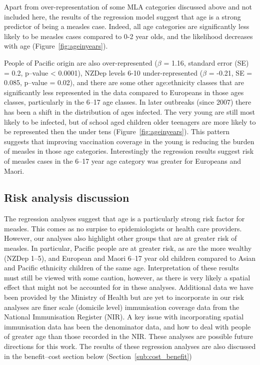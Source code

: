 \documentclass{article}
\begin{document}
Apart from over-representation of some MLA categories discussed above and not included here, the results of the regression model suggest that age is a strong predictor of being a measles case. Indeed, all age categories are significantly less likely to be measles cases compared to 0-2 year olds, and the likelihood decreases with age (Figure~\ref{fig:ageinyears}).

People of Pacific origin are also over-represented ($\beta$ = 1.16, standard error (SE) = 0.2, p--value < 0.0001), NZDep levels 6-10 under-represented ($\beta$ = -0.21, SE = 0.085, p--value = 0.02), and there are some other age:ethnicity classes that are significantly less represented in the data compared to Europeans in those ages classes, particularly in the 6--17 age classes. In later outbreaks (since 2007) there has been a shift in the distribution of ages infected. The very young are still most likely to be infected, but of school aged children older teenagers are more likely to be represented then the under tens (Figure~\ref{fig:ageinyears}). This pattern suggests that improving vaccination coverage in the young is reducing the burden of measles in those age categories. Interestingly the regression results suggest risk of measles cases in the 6--17 year age category was greater for Europeans and Maori.

\subsection{Risk analysis discussion}

The regression analyses suggest that age is a particularly strong risk factor for measles. This comes as no surpise to epidemiologists or health care providers. However, our analyses also highlight other groups that are at greater risk of measles. In particular, Pacific people are at greater risk, as are the more wealthy (NZDep 1--5), and European and Maori 6--17 year old children compared to Asian and Pacific ethnicity children of the same age. Interpretation of these results must still be viewed with some caution, however, as there is very likely a spatial effect that might not be accounted for in these analyses. Additional data we have been provided by the Ministry of Health but are yet to incorporate in our risk analyses are finer scale (domicile level) immunisation coverage data from the National Immunisation Register (NIR). A key issue with incorporating spatial immunisation data has been the denominator data, and how to deal with people of greater age than those recorded in the NIR. These analyses are possible future directions for this work. The results of these regression analyses are also discussed in the benefit--cost section below (Section~\ref{sub:cost_benefit})
\end{document}
